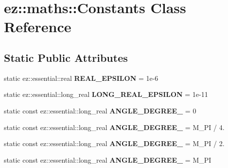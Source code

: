 \hypertarget{classez_1_1maths_1_1Constants}{}\section{ez\+:\+:maths\+:\+:Constants Class Reference}
\label{classez_1_1maths_1_1Constants}
\subsection*{Static Public Attributes}
\begin{DoxyCompactItemize}
\item 
\mbox{\label{classez_1_1maths_1_1Constants_a0561f868c8aafb751ac1264ed8f0dc5d}} 
static ez\+::essential\+::real {\bfseries R\+E\+A\+L\+\_\+\+E\+P\+S\+I\+L\+ON} = 1e-\/6
\item 
\mbox{\label{classez_1_1maths_1_1Constants_ab6f513c514636b09639cb0b47365864a}} 
static ez\+::essential\+::long\+\_\+real {\bfseries L\+O\+N\+G\+\_\+\+R\+E\+A\+L\+\_\+\+E\+P\+S\+I\+L\+ON} = 1e-\/11
\item 
\mbox{\label{classez_1_1maths_1_1Constants_af0aae4241854548e74deabaadd9ac960}} 
static const ez\+::essential\+::long\+\_\+real {\bfseries A\+N\+G\+L\+E\+\_\+\+D\+E\+G\+R\+E\+E\+\_} = 0
\item 
\mbox{\label{classez_1_1maths_1_1Constants_a1f680bb679b943ae87341e32ec25ffa8}} 
static const ez\+::essential\+::long\+\_\+real {\bfseries A\+N\+G\+L\+E\+\_\+\+D\+E\+G\+R\+E\+E\+\_} = M\+\_\+\+PI / 4.
\item 
\mbox{\label{classez_1_1maths_1_1Constants_a59d0ff7484411f15d20fc797d47e132c}} 
static const ez\+::essential\+::long\+\_\+real {\bfseries A\+N\+G\+L\+E\+\_\+\+D\+E\+G\+R\+E\+E\+\_} = M\+\_\+\+PI / 2.
\item 
\mbox{\label{classez_1_1maths_1_1Constants_a04c3104561dd7990ecc1cd2de9928c2d}} 
static const ez\+::essential\+::long\+\_\+real {\bfseries A\+N\+G\+L\+E\+\_\+\+D\+E\+G\+R\+E\+E\+\_} = M\+\_\+\+PI
\item 
\mbox{\label{classez_1_1maths_1_1Constants_a2a55adb151818c7c14e53a61670d0668}} 

\end{DoxyCompactItemize}
